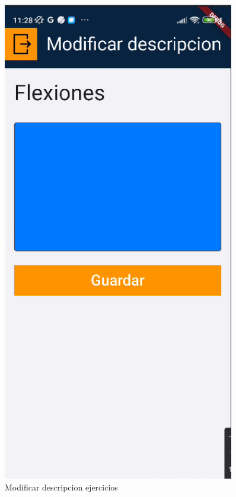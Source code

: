 \begin{figure}[H]
   \begin{minipage}{0.45\textwidth}
      \centering
      \includegraphics[width=0.9\textwidth]{pantallas/ModDescpEjer.png}
      \caption{Modificar descripcion ejercicios}
      \label{fig:ModDescpEjer}
   \end{minipage}
\end{figure}

